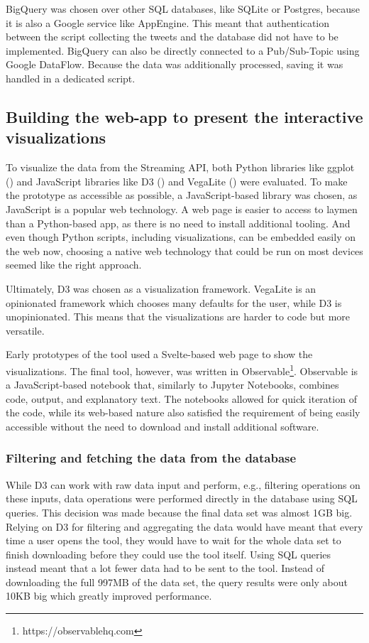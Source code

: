 BigQuery was chosen over other SQL databases, like SQLite or Postgres, because it is also a Google service like AppEngine. This meant that authentication between the script collecting the tweets and the database did not have to be implemented. BigQuery can also be directly connected to a Pub/Sub-Topic using Google DataFlow. Because the data was additionally processed, saving it was handled in a dedicated script. 

\subsection{Building the web-app to present the interactive visualizations}
To visualize the data from the Streaming API, both Python libraries like ggplot (\cite{wickhamGgplot2ElegantGraphics2016}) and JavaScript libraries like D3 (\cite{bostockD3JsDataDriven}) and VegaLite (\cite{uwidlVegaLiteHighLevelGrammar}) were evaluated. To make the prototype as accessible as possible, a JavaScript-based library was chosen, as JavaScript is a popular web technology. A web page is easier to access to laymen than a Python-based app, as there is no need to install additional tooling. And even though Python scripts, including visualizations, can be embedded easily on the web now, choosing a native web technology that could be run on most devices seemed like the right approach.

Ultimately, D3 was chosen as a visualization framework. VegaLite is an opinionated framework which chooses many defaults for the user, while D3 is unopinionated. This means that the visualizations are harder to code but more versatile.

Early prototypes of the tool used a Svelte-based web page to show the visualizations. The final tool, however, was written in Observable\footnote{https://observablehq.com}. Observable is a JavaScript-based notebook that, similarly to Jupyter Notebooks, combines code, output, and explanatory text. The notebooks allowed for quick iteration of the code, while its web-based nature also satisfied the requirement of being easily accessible without the need to download and install additional software.

\subsubsection{Filtering and fetching the data from the database}
While D3 can work with raw data input and perform, e.g., filtering operations on these inputs, data operations were performed directly in the database using SQL queries. This decision was made because the final data set was almost 1GB big. Relying on D3 for filtering and aggregating the data would have meant that every time a user opens the tool, they would have to wait for the whole data set to finish downloading before they could use the tool itself. Using SQL queries instead meant that a lot fewer data had to be sent to the tool. Instead of downloading the full 997MB of the data set, the query results were only about 10KB big which greatly improved performance.

